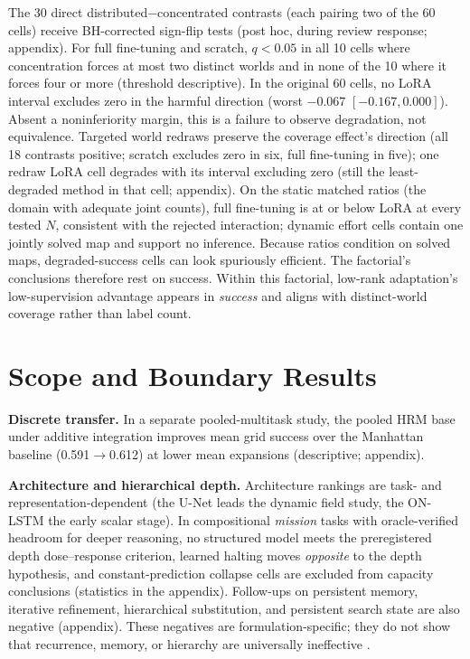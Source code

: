 \documentclass[letterpaper]{article} %
\begin{document}
The 30 direct distributed$-$concentrated contrasts (each pairing two of the 60 cells) receive BH-corrected sign-flip tests (post hoc, during review response; appendix). For full fine-tuning and scratch, $q{<}0.05$ in all 10 cells where concentration forces at most two distinct worlds and in none of the 10 where it forces four or more (threshold descriptive). In the original 60 cells, no LoRA interval excludes zero in the harmful direction (worst $-0.067$ $[-0.167, 0.000]$). Absent a noninferiority margin, this is a failure to observe degradation, not equivalence. Targeted world redraws preserve the coverage effect's direction (all 18 contrasts positive; scratch excludes zero in six, full fine-tuning in five); one redraw LoRA cell degrades with its interval excluding zero (still the least-degraded method in that cell; appendix). On the static matched ratios (the domain with adequate joint counts), full fine-tuning is at or below LoRA at every tested $N$, consistent with the rejected interaction; dynamic effort cells contain one jointly solved map and support no inference. Because ratios condition on solved maps, degraded-success cells can look spuriously efficient. The factorial's conclusions therefore rest on success. Within this factorial, low-rank adaptation's low-supervision advantage appears in \emph{success} and aligns with distinct-world coverage rather than label count.

\section{Scope and Boundary Results}

\textbf{Discrete transfer.} In a separate pooled-multitask study, the pooled HRM base under additive integration improves mean grid success over the Manhattan baseline (0.591$\to$0.612) at lower mean expansions (descriptive; appendix).

\textbf{Architecture and hierarchical depth.} Architecture rankings are task- and representation-dependent (the U-Net leads the dynamic field study, the ON-LSTM the early scalar stage). In compositional \emph{mission} tasks with oracle-verified headroom for deeper reasoning, no structured model meets the preregistered depth dose--response criterion, learned halting moves \emph{opposite} to the depth hypothesis, and constant-prediction collapse cells are excluded from capacity conclusions (statistics in the appendix). Follow-ups on persistent memory, iterative refinement, hierarchical substitution, and persistent search state are also negative (appendix). These negatives are formulation-specific; they do not show that recurrence, memory, or hierarchy are universally ineffective \citep{jolicoeur2025trm,czechowski2021subgoal}.
\end{document}
